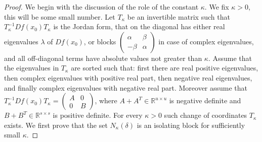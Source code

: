 \documentclass[11pt, leqno]{amsart}
\theoremstyle{definition}
\def\R{\mathbb{R}}
\begin{document}
\begin{proof}
We begin with the discussion of the role of the constant $\kappa$. We fix $\kappa >0$,  this will be some small number.
	Let $T_\kappa$ be an invertible matrix such that $T_\kappa^{-1} D f(x_0) T_\kappa$ is the Jordan form, that on the diagonal has either real eigenvalues $\lambda$  of $D f(x_0)$, or blocks $\begin{pmatrix}\alpha & \beta\\ -\beta & \alpha \end{pmatrix}$ in case of complex eigenvalues, and all off-diagonal terms have absolute values   not greater than $\kappa$. Assume that the eigenvalues in $T_\kappa$ are sorted such that: first there are real positive eigenvalues, then complex eigenvalues with positive real part, then negative real eigenvalues, and finally complex eigenvalues with negative real part. Moreover assume that
 $T_\kappa^{-1} D f(x_0) T_\kappa = \begin{pmatrix} A& 0\\ 0 & B\end{pmatrix}$, where $A+A^T \in \R^{u\times u}$ is negative definite and $B+B^T \in \R^{s\times s}$ is positive definite.  For every $\kappa > 0$ such change of coordinates $T_\kappa$ exists.  We first prove that the set $N_\kappa(\delta)$
 is an isolating block for sufficiently small $\kappa$.


\end{proof}
\end{document}
